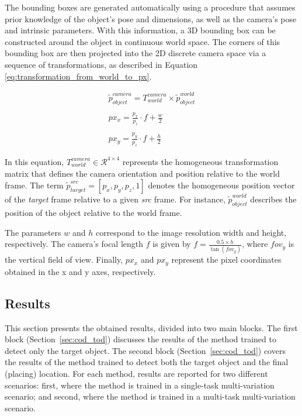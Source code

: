 The bounding boxes are generated automatically using a procedure that assumes prior knowledge of the object's pose and dimensions, as well as the camera's pose and intrinsic parameters. With this information, a 3D bounding box can be constructed around the object in continuous world space. The corners of this bounding box are then projected into the 2D discrete camera space via a sequence of transformations, as described in Equation \ref{eq:transformation_from_world_to_px}.

\begin{equation}
    \label{eq:transformation_from_world_to_px}
    \begin{matrix}
        \tilde{p}^{camera}_{object} = T^{camera}_{world} \times \tilde{p}^{world}_{object}
        \\ \\
        px_x =  \frac{p_x}{p_z} \cdot f + \frac{w}{2} 
        \\ \\
        px_y =  \frac{p_y}{p_z} \cdot f + \frac{h}{2}
    \end{matrix}
\end{equation}

In this equation, $T^{camera}_{world} \in \mathcal{R}^{4 \times 4}$ represents the homogeneous transformation matrix that defines the camera orientation and position relative to the world frame. The term $\tilde{p}^{src}_{target} = \left[ p_x, p_y, p_z, 1 \right]$ denotes the homogeneous position vector of the \textit{target} frame relative to a given \textit{src} frame. For instance, $\tilde{p}^{world}_{object}$ describes the position of the object relative to the world frame. 

The parameters $w$ and $h$ correspond to the image resolution width and height, respectively. The camera's focal length $f$ is given by $f = \frac{0.5 \times h}{\tan(fov_y)}$, where $fov_y$ is the vertical field of view. Finally, $px_x$ and $px_y$ represent the pixel coordinates obtained in the x and y axes, respectively.

\subsection{Results}
\label{sec:cod_results}
This section presents the obtained results, divided into two main blocks. The first block (Section~\ref{sec:cod_tod}) discusses the results of the method trained to detect only the target object. The second block (Section~\ref{sec:cod_tod}) covers the results of the method trained to detect both the target object and the final (placing) location. For each method, results are reported for two different scenarios: first, where the method is trained in a single-task multi-variation scenario; and second, where the method is trained in a multi-task multi-variation scenario.

